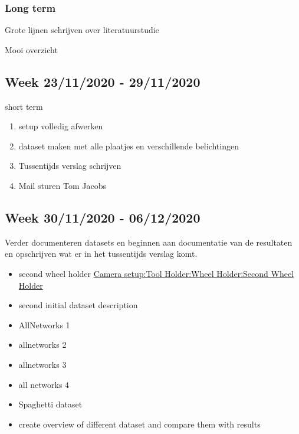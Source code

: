 \documentclass{scrartcl}
\begin{document}
\subsubsection{Long term}

Grote lijnen schrijven over literatuurstudie

Mooi overzicht



\subsection{Week 23/11/2020 - 29/11/2020}

short term

\begin{enumerate}[1]
\item setup volledig afwerken 
\item dataset maken met alle plaatjes en verschillende belichtingen
\item Tussentijds verslag schrijven
\item Mail sturen Tom Jacobs
\end{enumerate}


\subsection{Week 30/11/2020 - 06/12/2020}

Verder documenteren datasets en beginnen aan documentatie van de resultaten en opschrijven wat er in het tussentijds verslag komt.



\begin{itemize}
\item[\CheckedBox] second wheel holder \href{../../Camera_setup/Tool_Holder/Wheel_Holder/Second_Wheel_Holder.tex}{Camera setup:Tool Holder:Wheel Holder:Second Wheel Holder}
\item[\CheckedBox] second initial dataset description
\item[\CheckedBox] AllNetworks 1
\item[\CheckedBox] allnetworks 2
\item[\CheckedBox] allnetworks 3
\item[\CheckedBox] all networks 4
\item[\CheckedBox] Spaghetti dataset
\item[\Square] create overview of different dataset and compare them with results
\end{itemize}
\end{document}
